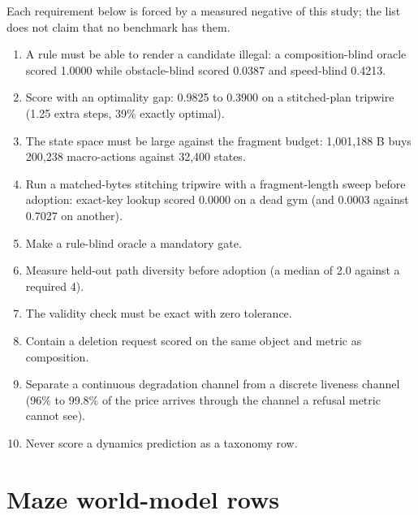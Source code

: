 \documentclass{article} %
\begin{document}
Each requirement below is forced by a measured negative of this study; the list does not
claim that no benchmark has them. %
\begin{enumerate}[leftmargin=*,itemsep=1pt]
\item A rule must be able to render a candidate illegal: a composition-blind oracle scored 1.0000
  while obstacle-blind scored 0.0387 and speed-blind 0.4213. %
\item Score with an optimality gap: 0.9825 to 0.3900 on a stitched-plan tripwire (1.25 extra steps,
  39\% exactly optimal). %
\item The state space must be large against the fragment budget: 1,001,188 B buys 200,238
  macro-actions against 32,400 states. %
\item Run a matched-bytes stitching tripwire with a fragment-length sweep before adoption: exact-key
  lookup scored 0.0000 on a dead gym (and 0.0003 against 0.7027 on another).
\item Make a rule-blind oracle a mandatory gate.
\item Measure held-out path diversity before adoption (a median of 2.0 against a required 4).
\item The validity check must be exact with zero tolerance.
\item Contain a deletion request scored on the same object and metric as composition.
\item Separate a continuous degradation channel from a discrete liveness channel (96\% to 99.8\% of
  the price arrives through the channel a refusal metric cannot see). %
\item Never score a dynamics prediction as a taxonomy row.
\end{enumerate}

\section{Maze world-model rows}
\label{app:mazewm}
\end{document}
